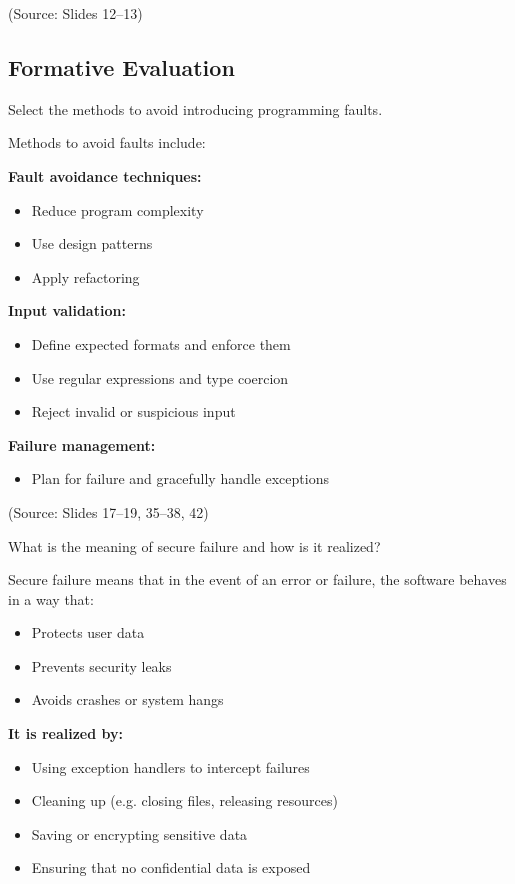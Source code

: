 \documentclass[12pt]{article}
\begin{document}
(Source: Slides 12--13)

\subsection{Formative Evaluation}

\begin{questionbox}
Select the methods to avoid introducing programming faults.
\end{questionbox}

Methods to avoid faults include:

\textbf{Fault avoidance techniques:}
\begin{itemize}
    \item Reduce program complexity
    \item Use design patterns
    \item Apply refactoring
\end{itemize}

\textbf{Input validation:}
\begin{itemize}
    \item Define expected formats and enforce them
    \item Use regular expressions and type coercion
    \item Reject invalid or suspicious input
\end{itemize}

\textbf{Failure management:}
\begin{itemize}
    \item Plan for failure and gracefully handle exceptions
\end{itemize}

(Source: Slides 17--19, 35--38, 42)

\begin{questionbox}
What is the meaning of secure failure and how is it realized?
\end{questionbox}

Secure failure means that in the event of an error or failure, the software behaves in a way that:
\begin{itemize}
    \item Protects user data
    \item Prevents security leaks
    \item Avoids crashes or system hangs
\end{itemize}

\textbf{It is realized by:}
\begin{itemize}
    \item Using exception handlers to intercept failures
    \item Cleaning up (e.g. closing files, releasing resources)
    \item Saving or encrypting sensitive data
    \item Ensuring that no confidential data is exposed
\end{itemize}
\end{document}
